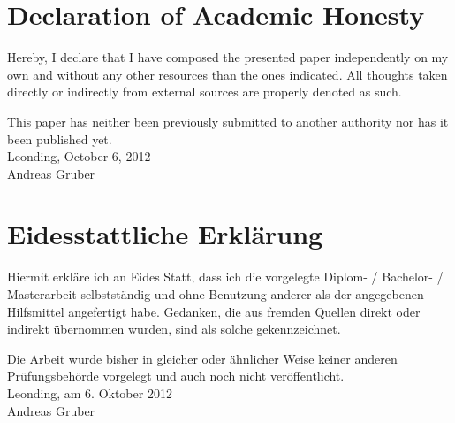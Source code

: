 \section*{Declaration of Academic Honesty}
Hereby, I declare that I have composed the presented paper independently on my own and without any other resources than the ones indicated. All thoughts taken directly or indirectly from external sources are properly denoted as such.

This paper has neither been previously submitted to another authority nor has it been published yet. \\[1em]
Leonding, October 6, 2012 \\[5em]
Andreas Gruber \\[5em]

\section*{Eidesstattliche Erklärung}
Hiermit erkläre ich an Eides Statt, dass ich die vorgelegte Diplom- / Bachelor- / Masterarbeit selbstständig und ohne Benutzung anderer als der angegebenen Hilfsmittel angefertigt habe. Gedanken, die aus fremden Quellen direkt oder indirekt übernommen wurden, sind als solche gekennzeichnet.

Die Arbeit wurde bisher in gleicher oder ähnlicher Weise keiner anderen Prüfungsbehörde vorgelegt und auch noch nicht veröffentlicht. \\[1em]
Leonding, am 6. Oktober 2012 \\[5em]
Andreas Gruber

